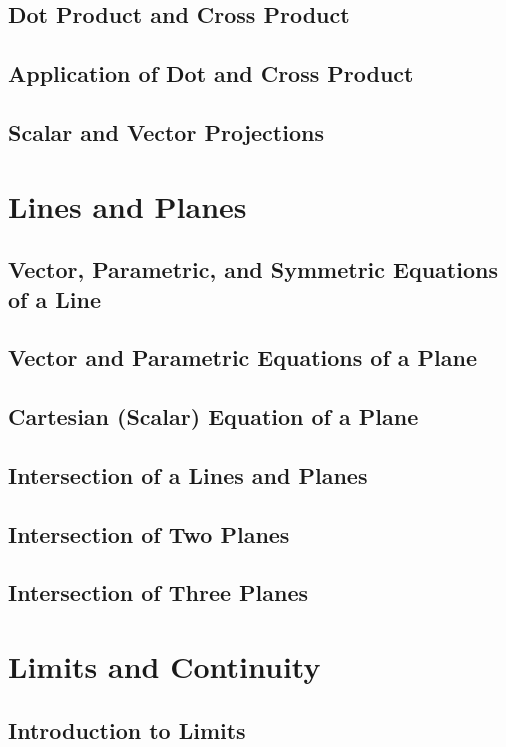 \documentclass[12pt]{article}
\begin{document}
        \subsection{Dot Product and Cross Product}
        \subsection{Application of Dot and Cross Product}
        \subsection{Scalar and Vector Projections}

    \section{Lines and Planes}
        \subsection{Vector, Parametric, and Symmetric Equations of a Line}
        \subsection{Vector and Parametric Equations of a Plane}
        \subsection{Cartesian (Scalar) Equation of a Plane}
        \subsection{Intersection of a Lines and Planes}
        \subsection{Intersection of Two Planes}
        \subsection{Intersection of Three Planes}

    \section{Limits and Continuity}
        \subsection{Introduction to Limits}
\end{document}
